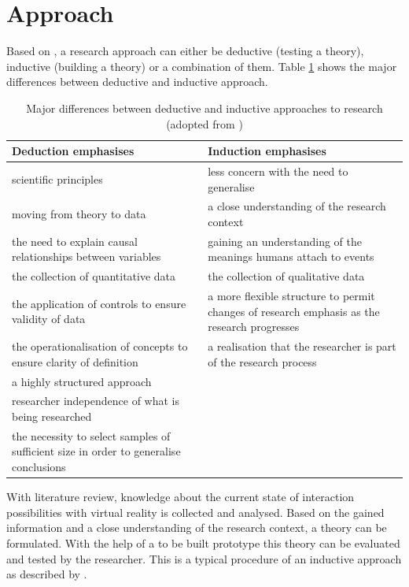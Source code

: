 \section{Approach}

Based on \cite{Saunders2009}, a research approach can either be deductive (testing a theory), inductive (building a theory) or a combination of them. Table \ref{tbl:inductivedeductive} shows the major differences between deductive and inductive approach.
\begin{table}[h!]
	\begin{center}
		\begin{tabular}{ p{6.5cm} p{7.5cm} }
			\toprule
			\textbf{Deduction emphasises} & \textbf{Induction emphasises} \\
			\midrule
			scientific principles & less concern with the need to generalise \\
			moving from theory to data & a close understanding of the research context  \\
			the need to explain causal relationships between variables & gaining an understanding of the meanings humans attach to events \\
			the collection of quantitative data & the collection of qualitative data \\
			the application of controls to ensure validity of data & a more flexible structure to permit changes of research emphasis as the research progresses \\
			the operationalisation of concepts to ensure clarity of definition & a realisation that the researcher is part of the research process \\
			a highly structured approach & \\
			researcher independence of what is being researched & \\
			the necessity to select samples of sufficient size in order to generalise conclusions & \\
			\bottomrule
		\end{tabular}
		\caption[Major differences between deductive and inductive approaches to research]{Major differences between deductive and inductive approaches to research (adopted from {\citealp[pg. 127]{Saunders2009}})}
		\label{tbl:inductivedeductive}
	\end{center}
\end{table}
\newline
With literature review, knowledge about the current state of interaction possibilities with virtual reality is collected and analysed. Based on the gained information and a close understanding of the research context, a theory can be formulated. With the help of a to be built prototype this theory can be evaluated and tested by the researcher. This is a typical procedure of an inductive approach as described by \cite{Saunders2009}. \newline
